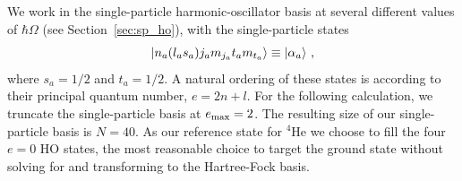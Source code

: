 We work in the single-particle harmonic-oscillator basis
at several different values of $\hbar \Omega$
(see Section~\ref{sec:sp_ho}),
with the single-particle states
\begin{equation}
  \ket{n_a (l_a s_a) j_a m_{j_a} t_a m_{t_a}} \equiv \ket{\alpha_a}\,,
\end{equation}
where $s_a=1/2$ and $t_a=1/2$.
A natural ordering of these states is according to their principal quantum number,
$e = 2  n + l$.
For the following calculation, we truncate the single-particle basis at $e_{\text{max}}=2$.
The resulting size of our single-particle basis is $N=40$.
As our reference state for ${}^4\text{He}$ we choose to fill the four $e=0$ HO states,
the most reasonable choice to target the ground state
without solving for and transforming to the Hartree-Fock basis.

